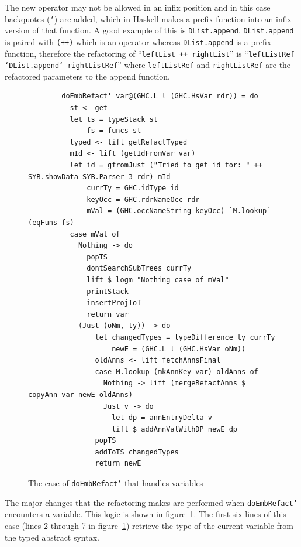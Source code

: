 The new operator may not be allowed in an infix position and in this case backquotes (\texttt{`}) are added, which in Haskell makes a prefix function into an infix version of that function. A good example of this is \texttt{DList.append}. \texttt{DList.append} is paired with \texttt{(++)} which is an operator whereas \texttt{DList.append} is a prefix function, therefore the refactoring of ``\texttt{leftList ++ rightList}'' is ``\texttt{leftListRef `DList.append` rightListRef}'' where \texttt{leftListRef} and \texttt{rightListRef} are the refactored parameters to the append function.

\begin{figure}[!t]
\begin{lstlisting}
        doEmbRefact' var@(GHC.L l (GHC.HsVar rdr)) = do
          st <- get          
          let ts = typeStack st
              fs = funcs st              
          typed <- lift getRefactTyped
          mId <- lift (getIdFromVar var)
          let id = gfromJust ("Tried to get id for: " ++ SYB.showData SYB.Parser 3 rdr) mId
              currTy = GHC.idType id
              keyOcc = GHC.rdrNameOcc rdr
              mVal = (GHC.occNameString keyOcc) `M.lookup` (eqFuns fs)
          case mVal of
            Nothing -> do
              popTS
              dontSearchSubTrees currTy
              lift $ logm "Nothing case of mVal"
              printStack
              insertProjToT
              return var
            (Just (oNm, ty)) -> do
                let changedTypes = typeDifference ty currTy
                    newE = (GHC.L l (GHC.HsVar oNm))
                oldAnns <- lift fetchAnnsFinal
                case M.lookup (mkAnnKey var) oldAnns of
                  Nothing -> lift (mergeRefactAnns $ copyAnn var newE oldAnns)
                  Just v -> do
                    let dp = annEntryDelta v
                    lift $ addAnnValWithDP newE dp
                popTS
                addToTS changedTypes                
                return newE
\end{lstlisting}
\caption{The case of \texttt{doEmbRefact'} that handles variables}
\label{embRefactVar}
\end{figure}

The major changes that the refactoring makes are performed when \texttt{doEmbRefact'} encounters a variable. This logic is shown in figure~\ref{embRefactVar}. The first six lines of this case (lines 2 through 7 in figure~\ref{embRefactVar}) retrieve the type of the current variable from the typed abstract syntax. 

